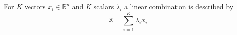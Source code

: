 For $K$ vectors $x_i \in \mathbb{R}^n$ and $K$ scalars $\lambda_i$ a linear combination is described by $$\mathbb{X} = \sum\limits_{i=1}^{K} \lambda_i x_i$$
